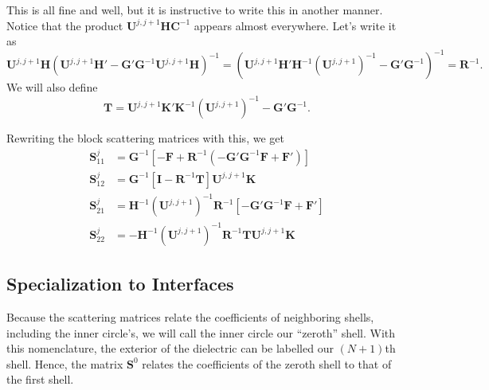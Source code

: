 This is all fine and well, but it is instructive to write this 
in another manner. Notice that the product $\mathbf{U}^{j,j+1}\mathbf{HC}^{-1}$ 
appears almost everywhere. Let's write it as
  \begin{equation}
   \mathbf{U}^{j,j+1}\mathbf{H}\left(\mathbf{U}^{j,j+1}\mathbf{H}'-\mathbf{G}'\mathbf{G}^{-1}\mathbf{U}^{j,j+1}\mathbf{H}\right)^{-1}
    = 
    \left(\mathbf{U}^{j,j+1}\mathbf{H}'\mathbf{H}^{-1}(\mathbf{U}^{j,j+1})^{-1}-\mathbf{G}'\mathbf{G}^{-1}\right)^{-1} = \mathbf{R}^{-1}.
  \end{equation}
We will also define
  \begin{equation}
    \mathbf{T} = \mathbf{U}^{j,j+1}\mathbf{K}'\mathbf{K}^{-1}(\mathbf{U}^{j,j+1})^{-1}-\mathbf{G}'\mathbf{G}^{-1}.
  \end{equation}

Rewriting the block scattering matrices with this, we get
  \begin{subequations}
  \begin{align}
    \mathbf{S}^j_{11}	&= \mathbf{G}^{-1}\left[-\mathbf{F}+\mathbf{R}^{-1}\left(-\mathbf{G}'\mathbf{G}^{-1}\mathbf{F}+\mathbf{F}'\right)\right]	\\
    \mathbf{S}^j_{12}	&= \mathbf{G}^{-1}\left[\mathbf{I}-\mathbf{R}^{-1}\mathbf{T}\right]\mathbf{U}^{j,j+1}\mathbf{K}				\\
    \mathbf{S}^j_{21}	&= \mathbf{H}^{-1}(\mathbf{U}^{j,j+1})^{-1}\mathbf{R}^{-1}\left[-\mathbf{G}'\mathbf{G}^{-1}\mathbf{F}+\mathbf{F}'\right]\\
    \mathbf{S}^j_{22}	&= -\mathbf{H}^{-1}(\mathbf{U}^{j,j+1})^{-1}\mathbf{R}^{-1}\mathbf{TU}^{j,j+1}\mathbf{K}
  \end{align}
  \end{subequations}

\subsection{Specialization to Interfaces}
Because the scattering matrices relate the coefficients
of neighboring shells, including the inner circle's, 
we will call the inner circle our ``zeroth'' shell. 
With this nomenclature, the exterior of the dielectric
can be labelled our $(N+1)$th shell. Hence, the matrix
$\mathbf{S}^0$ relates the coefficients of the zeroth shell
to that of the first shell.

